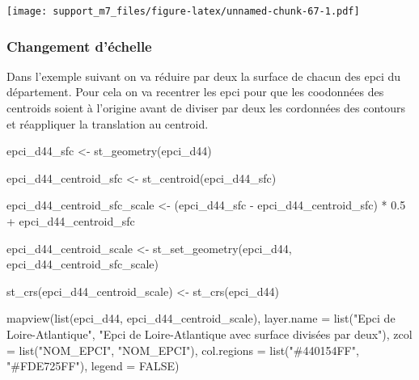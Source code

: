 \documentclass[
]{book}
\newenvironment{Shaded}{\begin{snugshade}}{\end{snugshade}}
\newcommand{\AttributeTok}[1]{\textcolor[rgb]{0.77,0.63,0.00}{#1}}
\newcommand{\ConstantTok}[1]{\textcolor[rgb]{0.00,0.00,0.00}{#1}}
\newcommand{\FloatTok}[1]{\textcolor[rgb]{0.00,0.00,0.81}{#1}}
\newcommand{\FunctionTok}[1]{\textcolor[rgb]{0.00,0.00,0.00}{#1}}
\newcommand{\NormalTok}[1]{#1}
\newcommand{\OtherTok}[1]{\textcolor[rgb]{0.56,0.35,0.01}{#1}}
\newcommand{\SpecialCharTok}[1]{\textcolor[rgb]{0.00,0.00,0.00}{#1}}
\newcommand{\StringTok}[1]{\textcolor[rgb]{0.31,0.60,0.02}{#1}}
\begin{document}
\texttt{[image: support\_m7\_files/figure-latex/unnamed-chunk-67-1.pdf]}

\hypertarget{changement-duxe9chelle}{%
\subsubsection{Changement d'échelle}\label{changement-duxe9chelle}}

Dans l'exemple suivant on va réduire par deux la surface de chacun des epci du département.
Pour cela on va recentrer les epci pour que les coodonnées des centroids soient à l'origine avant de diviser par deux les cordonnées des contours et réappliquer la translation au centroid.

\begin{Shaded}
\begin{Highlighting}[]
\NormalTok{epci\_d44\_sfc }\OtherTok{\textless{}{-}} \FunctionTok{st\_geometry}\NormalTok{(epci\_d44)}

\NormalTok{epci\_d44\_centroid\_sfc }\OtherTok{\textless{}{-}} \FunctionTok{st\_centroid}\NormalTok{(epci\_d44\_sfc)}

\NormalTok{epci\_d44\_centroid\_sfc\_scale }\OtherTok{\textless{}{-}}\NormalTok{ (epci\_d44\_sfc }\SpecialCharTok{{-}}\NormalTok{ epci\_d44\_centroid\_sfc) }\SpecialCharTok{*} \FloatTok{0.5} \SpecialCharTok{+}\NormalTok{ epci\_d44\_centroid\_sfc}

\NormalTok{epci\_d44\_centroid\_scale }\OtherTok{\textless{}{-}} \FunctionTok{st\_set\_geometry}\NormalTok{(epci\_d44, epci\_d44\_centroid\_sfc\_scale)}

\FunctionTok{st\_crs}\NormalTok{(epci\_d44\_centroid\_scale) }\OtherTok{\textless{}{-}} \FunctionTok{st\_crs}\NormalTok{(epci\_d44)}


\FunctionTok{mapview}\NormalTok{(}\FunctionTok{list}\NormalTok{(epci\_d44, epci\_d44\_centroid\_scale), }\AttributeTok{layer.name =} \FunctionTok{list}\NormalTok{(}\StringTok{"Epci de Loire{-}Atlantique"}\NormalTok{, }\StringTok{"Epci de Loire{-}Atlantique avec surface divisées par deux"}\NormalTok{), }\AttributeTok{zcol =} \FunctionTok{list}\NormalTok{(}\StringTok{"NOM\_EPCI"}\NormalTok{, }\StringTok{"NOM\_EPCI"}\NormalTok{), }\AttributeTok{col.regions =} \FunctionTok{list}\NormalTok{(}\StringTok{"\#440154FF"}\NormalTok{, }\StringTok{"\#FDE725FF"}\NormalTok{), }\AttributeTok{legend =} \ConstantTok{FALSE}\NormalTok{)}
\end{Highlighting}
\end{Shaded}
\end{document}
